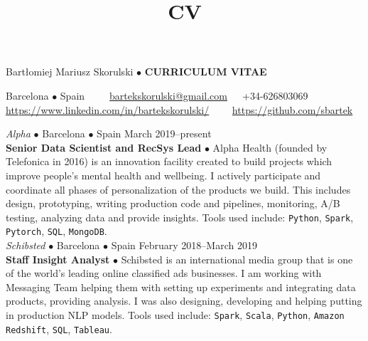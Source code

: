 \documentclass[a4paper, oneside]{scrreprt}
\title{CV}
\author{}
\date{}
\begin{document}
\vspace{0.4cm}
\noindent Bartłomiej Mariusz Skorulski $\bullet$ \textbf{CURRICULUM VITAE}

\vspace{-0.3cm}
\noindent\makebox[\linewidth]{\rule{\textwidth}{0.4pt}}

\noindent\llap{\FA \faHome\ \ } Barcelona $\bullet$ Spain\ \
{\FA \faEnvelope\ \ }\ \href{mailto:bartekskorulski@gmail.com}{bartekskorulski@gmail.com}\ \ 
{\FA \faMobilePhone}\  +34-626803069\\
\noindent\llap{\FA \faLinkedin\ \ } 
\href{https://www.linkedin.com/in/bartekskorulski/}{https://www.linkedin.com/in/bartekskorulski/}\ \ 
{\FA \faGithub\ \ } \href{https://github.com/sbartek}{https://github.com/sbartek}

\vspace{-0.3cm}
\noindent\makebox[\linewidth]{\rule{\textwidth}{0.4pt}}
\vspace{-0.2cm}
\marginpar{
  \sectit{Main Professional Experience}
}

\vspace{-0.3cm}
\noindent{}
\hspace{-0.15cm}\textit{Alpha} $\bullet$ 
Barcelona $\bullet$ Spain \hfill March 2019--present\\
\noindent\textbf{\small Senior Data Scientist and RecSys Lead} $\bullet$ 
{\small Alpha Health (founded by Telefonica in 2016) is an innovation facility created to build
  projects which improve people's mental health and wellbeing. I actively participate and coordinate
  all phases of personalization of the products we build. This includes design,
  prototyping, writing production code and pipelines, monitoring, A/B testing, analyzing data and
  provide insights. Tools used include: \texttt{Python}, \texttt{Spark}, \texttt{Pytorch},  \texttt{SQL},
  \texttt{MongoDB}. }\\

\vspace{-0.3cm}
\noindent{}
\hspace{-0.15cm}\textit{Schibsted} $\bullet$ 
Barcelona $\bullet$ Spain \hfill February 2018--March 2019\\
\noindent\textbf{\small Staff Insight Analyst } $\bullet$ 
{\small Schibsted is an international media group that is one of the world’s leading online
  classified ads businesses.  I am working with Messaging Team helping them with setting up
  experiments and integrating data products, providing analysis. I was also designing, developing
  and helping putting in production NLP models. Tools used include: \texttt{Spark}, \texttt{Scala},
  \texttt{Python},
  \texttt{Amazon Redshift}, \texttt{SQL}, \texttt{Tableau}. }\\
\end{document}
